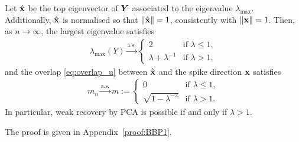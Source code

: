 \begin{theo}\label{thm:bbp}
Let $\hat{\boldsymbol{\mathbf{x}}}$ be the top eigenvector of $\bm{Y}$ associated to the eigenvalue $\lambda_{\max}$. Additionally, $\hat{\boldsymbol{\mathbf{x}}}$ is normalised so that $\|\hat{\boldsymbol{\mathbf{x}}}\| = 1$, consistently with $\|\boldsymbol{\mathbf{x}}\| = 1$. Then, as $n\to\infty$, the largest eigenvalue satisfies
\begin{align}
\lambda_{\max}(Y)\xrightarrow{\mathrm{a.s.}}
\begin{cases}
2 & \text{if } \lambda \le 1,\\[0.3em]
\lambda+\lambda^{-1} & \text{if } \lambda > 1,
\end{cases}
\end{align}
and the overlap \eqref{eq:overlap_u} between $\hat{\boldsymbol{\mathbf{x}}}$ and the spike direction $\boldsymbol{\mathbf{x}}$ satisfies
\begin{align}
    m_n
    \xrightarrow{\mathrm{a.s.}}
    m := \begin{cases}
        0 & \text{if } \lambda \le 1,\\[0.3em]
        \sqrt{1-\lambda^{-2}} & \text{if } \lambda > 1.
    \end{cases}
\end{align}
In particular, weak recovery by PCA is possible if and only if \(\lambda>1\).
\end{theo}
The proof is given in Appendix~\ref{proof:BBP1}.